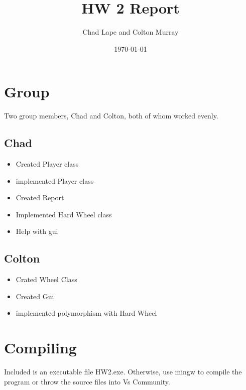 \documentclass[10pt]{article}
\title{HW 2 Report}
\author{Chad Lape and Colton Murray}
\date{\today}
\begin{document}
	\maketitle
	\section{Group}
	Two group members, Chad and Colton, both of whom worked evenly.
	\subsection{Chad}
	\begin{itemize}
		\item Created Player class
		\item implemented Player class
		\item Created Report
		\item Implemented Hard Wheel class
		\item Help with gui
	\end{itemize}
	\subsection{Colton}
	\begin{itemize}
		\item Crated Wheel Class
		\item Created Gui
		\item implemented polymorphism with Hard Wheel
	\end{itemize}
	\section{Compiling}
	Included is an executable file HW2.exe. Otherwise, use mingw to compile the program or throw the source files into Vs Community.
\end{document}
